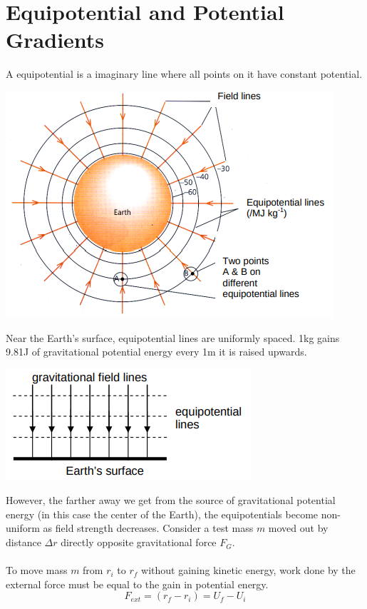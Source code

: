 \documentclass{article}
\begin{document}
\section{Equipotential and Potential Gradients}
A equipotential is a imaginary line where all points on it have constant potential. 
\begin{center}
    \includegraphics[scale=0.6]{assets/equipotentials.png}
\end{center}\leavevmode
Near the Earth's surface, equipotential lines are uniformly spaced. 1kg gains 9.81J of gravitational potential energy every 1m it is raised upwards.
\begin{center}
    \includegraphics[scale=0.6]{assets/surfaceEquipotentials.png}
\end{center}\leavevmode
However, the farther away we get from the source of gravitational potential energy (in this case the center of the Earth), the equipotentials become non-uniform as field strength decreases.
Consider a test mass $m$ moved out by distance $\Delta r$ directly opposite gravitational force $F_G$.
\\
\\To move mass $m$ from $r_i$ to $r_f$ without gaining kinetic energy, work done by the external force must be equal to the gain in potential energy.
\begin{equation}
    F_{ext}=(r_f-r_i)=U_f-U_i
\end{equation}
\end{document}
